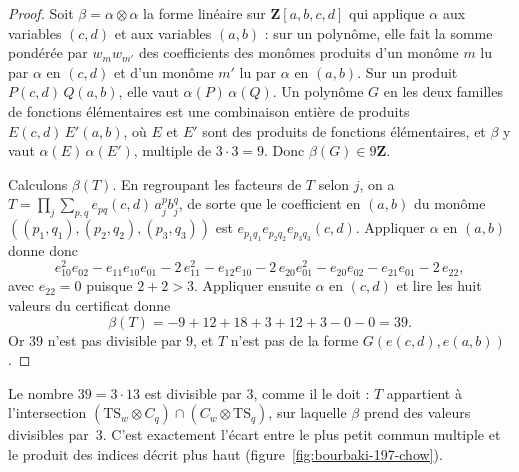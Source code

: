 \begin{proof}
Soit $\beta = \alpha \otimes \alpha$ la forme linéaire sur $\mathbf Z[a, b, c, d]$ qui applique $\alpha$ aux variables $(c, d)$ et aux variables $(a, b)$ : sur un polynôme, elle fait la somme pondérée par $w_m w_{m'}$ des coefficients des monômes produits d'un monôme $m$ lu par $\alpha$ en $(c, d)$ et d'un monôme $m'$ lu par $\alpha$ en $(a, b)$. Sur un produit $P(c, d)\, Q(a, b)$, elle vaut $\alpha(P)\, \alpha(Q)$. Un polynôme $G$ en les deux familles de fonctions élémentaires est une combinaison entière de produits $E(c, d)\, E'(a, b)$, où $E$ et $E'$ sont des produits de fonctions élémentaires, et $\beta$ y vaut $\alpha(E)\, \alpha(E')$, multiple de $3 \cdot 3 = 9$. Donc $\beta(G) \in 9\mathbf Z$.

Calculons $\beta(T)$. En regroupant les facteurs de $T$ selon $j$, on a $T = \prod_j \sum_{p,q} e_{pq}(c, d)\, a_j^p b_j^q$, de sorte que le coefficient en $(a, b)$ du monôme $((p_1, q_1), (p_2, q_2), (p_3, q_3))$ est $e_{p_1q_1} e_{p_2q_2} e_{p_3q_3}(c, d)$. Appliquer $\alpha$ en $(a, b)$ donne donc
\[
e_{10}^2 e_{02} - e_{11} e_{10} e_{01} - 2\, e_{11}^2 - e_{12} e_{10} - 2\, e_{20} e_{01}^2 - e_{20} e_{02} - e_{21} e_{01} - 2\, e_{22},
\]
avec $e_{22} = 0$ puisque $2 + 2 > 3$. Appliquer ensuite $\alpha$ en $(c, d)$ et lire les huit valeurs du certificat donne
\[
\beta(T) = -9 + 12 + 18 + 3 + 12 + 3 - 0 - 0 = 39 .
\]
Or $39$ n'est pas divisible par $9$, et $T$ n'est pas de la forme $G(e(c, d), e(a, b))$.
\end{proof}

Le nombre $39 = 3 \cdot 13$ est divisible par $3$, comme il le doit : $T$ appartient à l'intersection $(\mathrm{TS}_w \otimes C_q) \cap (C_w \otimes \mathrm{TS}_q)$, sur laquelle $\beta$ prend des valeurs divisibles par~$3$. C'est exactement l'écart entre le plus petit commun multiple et le produit des indices décrit plus haut (figure~\ref{fig:bourbaki-197-chow}).

